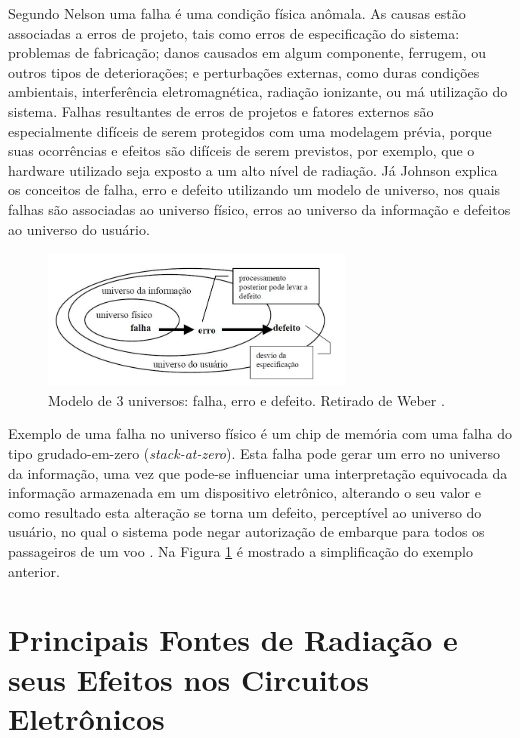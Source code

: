 Segundo Nelson \cite{Nelson:1990} uma falha é uma condição física anômala. As causas estão associadas a erros de projeto, tais como erros de especificação do sistema: problemas de fabricação; danos causados em algum componente, ferrugem, ou outros tipos de deteriorações; e perturbações externas, como duras condições ambientais, interferência eletromagnética, radiação ionizante, ou má utilização do sistema. Falhas resultantes de erros de projetos e fatores externos são especialmente difíceis de serem protegidos com uma modelagem prévia, porque suas ocorrências e efeitos são difíceis de serem previstos, por exemplo, que o hardware utilizado seja exposto a um alto nível de radiação. Já Johnson \cite{Johnson:1984} explica os conceitos de falha, erro e defeito utilizando um modelo de universo, nos quais falhas são associadas ao universo físico, erros ao universo da informação e defeitos ao universo do usuário. 

\begin{figure}[H]
	\centering
	\includegraphics[width=0.7\textwidth]{figuras/modeloUniverso.jpg}
	\caption[Modelo de três universos]{Modelo de 3 universos: falha, erro e defeito. Retirado de Weber \cite{Weber:2002}.}
	\label{Img:modeloUniverso}	
\end{figure}

Exemplo de uma falha no universo físico é um chip de memória com uma falha do tipo grudado-em-zero (\textit{stack-at-zero}). Esta falha pode gerar um erro no universo da informação, uma vez que pode-se influenciar uma interpretação equivocada da informação armazenada em um dispositivo eletrônico, alterando o seu valor e como resultado esta alteração se torna um defeito, perceptível ao universo do usuário, no qual o sistema pode negar autorização de embarque para todos os passageiros de um voo \cite{Nelson:1990}. Na Figura \ref{Img:modeloUniverso} é mostrado a simplificação do exemplo anterior.

\section{Principais Fontes de Radiação e seus Efeitos nos Circuitos Eletrônicos} \label{sec:radiacao}

